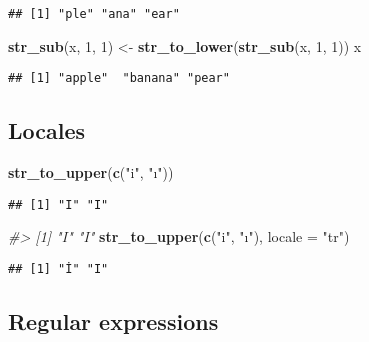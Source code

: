 \documentclass[
]{article}
\newenvironment{Shaded}{\begin{snugshade}}{\end{snugshade}}
\newcommand{\CommentTok}[1]{\textcolor[rgb]{0.56,0.35,0.01}{\textit{#1}}}
\newcommand{\DataTypeTok}[1]{\textcolor[rgb]{0.13,0.29,0.53}{#1}}
\newcommand{\DecValTok}[1]{\textcolor[rgb]{0.00,0.00,0.81}{#1}}
\newcommand{\KeywordTok}[1]{\textcolor[rgb]{0.13,0.29,0.53}{\textbf{#1}}}
\newcommand{\NormalTok}[1]{#1}
\newcommand{\StringTok}[1]{\textcolor[rgb]{0.31,0.60,0.02}{#1}}
\begin{document}
\begin{verbatim}
## [1] "ple" "ana" "ear"
\end{verbatim}

\begin{Shaded}
\begin{Highlighting}[]
\KeywordTok{str\_sub}\NormalTok{(x, }\DecValTok{1}\NormalTok{, }\DecValTok{1}\NormalTok{) \textless{}{-}}\StringTok{ }\KeywordTok{str\_to\_lower}\NormalTok{(}\KeywordTok{str\_sub}\NormalTok{(x, }\DecValTok{1}\NormalTok{, }\DecValTok{1}\NormalTok{))}
\NormalTok{x}
\end{Highlighting}
\end{Shaded}

\begin{verbatim}
## [1] "apple"  "banana" "pear"
\end{verbatim}

\hypertarget{locales}{%
\subsection{Locales}\label{locales}}

\begin{Shaded}
\begin{Highlighting}[]
\KeywordTok{str\_to\_upper}\NormalTok{(}\KeywordTok{c}\NormalTok{(}\StringTok{"i"}\NormalTok{, }\StringTok{"ı"}\NormalTok{))}
\end{Highlighting}
\end{Shaded}

\begin{verbatim}
## [1] "I" "I"
\end{verbatim}

\begin{Shaded}
\begin{Highlighting}[]
\CommentTok{\#\textgreater{} [1] "I" "I"}
\KeywordTok{str\_to\_upper}\NormalTok{(}\KeywordTok{c}\NormalTok{(}\StringTok{"i"}\NormalTok{, }\StringTok{"ı"}\NormalTok{), }\DataTypeTok{locale =} \StringTok{"tr"}\NormalTok{)}
\end{Highlighting}
\end{Shaded}

\begin{verbatim}
## [1] "İ" "I"
\end{verbatim}

\hypertarget{regular-expressions}{%
\subsection{Regular expressions}\label{regular-expressions}}
\end{document}

